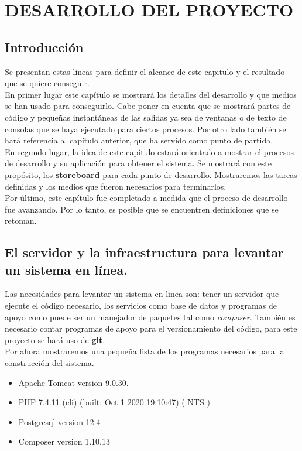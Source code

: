 \chapter{DESARROLLO DEL PROYECTO}
\section{Introducción}

Se presentan estas lineas para definir el alcance de este capitulo y el resultado que se quiere conseguir.\\

En primer lugar este capítulo se mostrará los detalles del desarrollo y que medios se han usado para conseguirlo. Cabe poner en cuenta que se mostrará partes de código y pequeñas instantáneas de las salidas ya sea de ventanas o de texto de consolas que se haya ejecutado para ciertos procesos. Por otro lado también se hará referencia al capítulo anterior, que ha servido como punto de partida.\\

En segundo lugar, la idea de este capítulo estará orientado a mostrar el procesos de desarrollo y su aplicación para obtener el sistema. Se mostrará con este propósito, los \textbf{storeboard} para cada punto de desarrollo. Mostraremos las tareas definidas y los medios que fueron necesarios para terminarlos.\\

Por último, este capítulo fue completado a medida que el proceso de desarrollo fue avanzando. Por lo tanto, es posible que se encuentren definiciones que se retoman.\\

\section{El servidor y la infraestructura para levantar un sistema en línea.}

Las necesidades para levantar un sistema en linea son: tener un servidor que ejecute el código necesario, los servicios como base de datos y programas de apoyo como puede ser un manejador de paquetes tal como \textit{composer}. También es necesario contar programas de apoyo para el versionamiento del código, para este proyecto se hará uso de \textbf{git}.\\

Por ahora mostraremos una pequeña lista de los programas necesarios para la construcción del sistema.

\begin{itemize}
\item Apache Tomcat version 9.0.30.
\item PHP 7.4.11 (cli) (built: Oct  1 2020 19:10:47) ( NTS )
\item Postgresql version 12.4
\item Composer version 1.10.13
\end{itemize}

